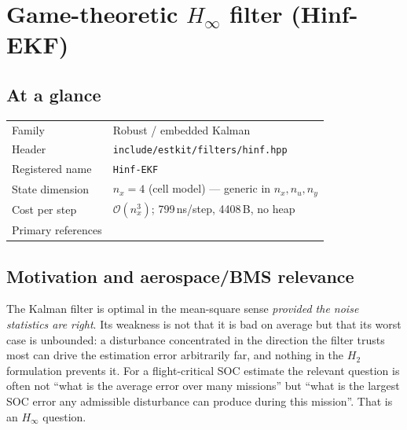 \providecommand{\vf}{\bm{f}} \providecommand{\vh}{\bm{h}}
\providecommand{\vd}{\bm{d}} \providecommand{\mM}{\bm{M}}
\providecommand{\va}{\bm{a}} \providecommand{\vb}{\bm{b}}

\chapter{Game-theoretic \texorpdfstring{$H_\infty$}{H-infinity} filter (Hinf-EKF)}
\label{ch:hinfekf}

\section*{At a glance}
\begin{tabular}{@{}l>{\raggedright\arraybackslash}p{}@{}}
Family & Robust / embedded Kalman \\
Header & \texttt{include/estkit/filters/hinf.hpp} \\
Registered name & \texttt{Hinf-EKF} \\
State dimension & $n_x = 4$ (cell model) --- generic in $n_x, n_u, n_y$ \\
Cost per step & $\mathcal{O}(n_x^3)$; 799\,ns/step, 4408\,B, no heap \\
Primary references & \cite{simon2006,shen1997hinf,hassibi1996hinf,kailath2000} \\
\end{tabular}

\section{Motivation and aerospace/BMS relevance}
The Kalman filter is optimal in the mean-square sense \emph{provided the noise statistics are
right}.  Its weakness is not that it is bad on average but that its worst case is unbounded: a
disturbance concentrated in the direction the filter trusts most can drive the estimation error
arbitrarily far, and nothing in the $H_2$ formulation prevents it.  For a flight-critical SOC
estimate the relevant question is often not ``what is the average error over many missions'' but
``what is the largest SOC error any admissible disturbance can produce during this mission''.
That is an $H_\infty$ question.


